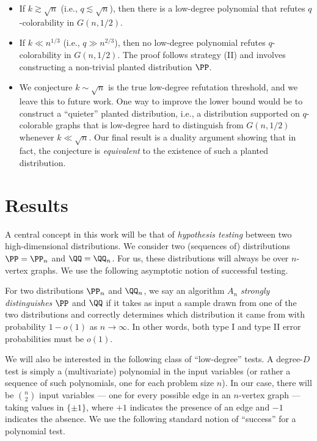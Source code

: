 \documentclass{article}
\begin{document}
\begin{itemize}
    \item If $k \gtrsim \sqrt{n}$ (i.e., $q \lesssim \sqrt{n}$), then there is a low-degree polynomial that refutes $q$-colorability in $G(n,1/2)$.
    \item If $k \ll n^{1/3}$ (i.e., $q \gg n^{2/3}$), then no low-degree polynomial refutes $q$-colorability in $G(n,1/2)$. The proof follows strategy (II) and involves constructing a non-trivial planted distribution $\PP$.
    \item We conjecture $k \sim \sqrt{n}$ is the true low-degree refutation threshold, and we leave this to future work. One way to improve the lower bound would be to construct a ``quieter'' planted distribution, i.e., a distribution supported on $q$-colorable graphs that is low-degree hard to distinguish from $G(n,1/2)$ whenever $k \ll \sqrt{n}$. Our final result is a duality argument showing that in fact, the conjecture is \emph{equivalent} to the existence of such a planted distribution.
\end{itemize}





\section{Results}


A central concept in this work will be that of {\em hypothesis testing} between two high-dimensional distributions. We consider two (sequences of) distributions $\PP = \PP_n$ and $\QQ = \QQ_n$. For us, these distributions will always be over $n$-vertex graphs. We use the following asymptotic notion of successful testing.

\begin{definition}\label{def:strong-det}
For two distributions $\PP_n$ and $\QQ_n$, we say an algorithm $A_n$ \emph{strongly distinguishes} $\PP$ and $\QQ$ if it takes as input a sample drawn from one of the two distributions and correctly determines which distribution it came from with probability $1-o(1)$ as $n \to \infty$. In other words, both type I and type II error probabilities must be $o(1)$.
\end{definition}

We will also be interested in the following class of ``low-degree'' tests. A degree-$D$ test is simply a (multivariate) polynomial in the input variables (or rather a sequence of such polynomials, one for each problem size $n$). In our case, there will be $\binom{n}{2}$ input variables --- one for every possible edge in an $n$-vertex graph --- taking values in $\{\pm 1\}$, where $+1$ indicates the presence of an edge and $-1$ indicates the absence. We use the following standard notion of ``success'' for a polynomial test.
\end{document}
